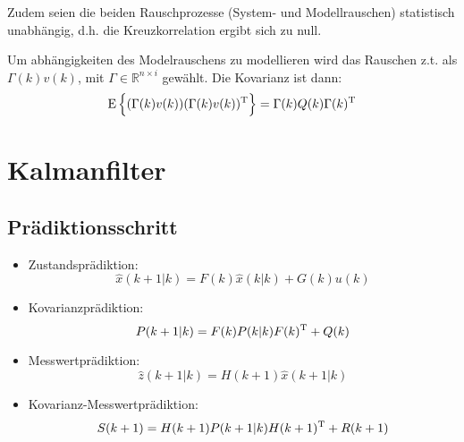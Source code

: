 Zudem seien die beiden Rauschprozesse (System- und Modellrauschen) statistisch unabhängig, d.h.
die Kreuzkorrelation ergibt sich zu null.

Um abhängigkeiten des Modelrauschens zu modellieren wird das Rauschen z.t. als $\Gamma(k) v(k)$, mit
$\Gamma \in \mathbb{R}^{n \times i}$ gewählt. Die Kovarianz ist dann:
\begin{equation*}
    \operatorname*{E}\left\{(\Gamma(k)v(k))(\Gamma(k)v(k))^\text{T}\right\} = \Gamma(k) Q(k) \Gamma(k)^\text{T}
\end{equation*}

\section{Kalmanfilter}
\subsection{Prädiktionsschritt}
\begin{itemize}
    \item Zustandsprädiktion:
        \begin{equation*}
            \hat{x}(k+1|k) = F(k) \hat{x}(k|k) + G(k) u(k)
        \end{equation*} 
    \item Kovarianzprädiktion:
        \begin{equation*}
            P(k+1|k) = F(k)P(k|k)F(k)^\text{T} + Q(k)
        \end{equation*}
    \item Messwertprädiktion:
        \begin{equation*}
            \hat{z}(k+1|k) = H(k+1) \hat{x}(k+1|k)
        \end{equation*}
    \item Kovarianz-Messwertprädiktion:
        \begin{equation*}
            S(k+1) = H(k+1)P(k+1|k)H(k+1)^\text{T} + R(k+1)
        \end{equation*}
\end{itemize}

